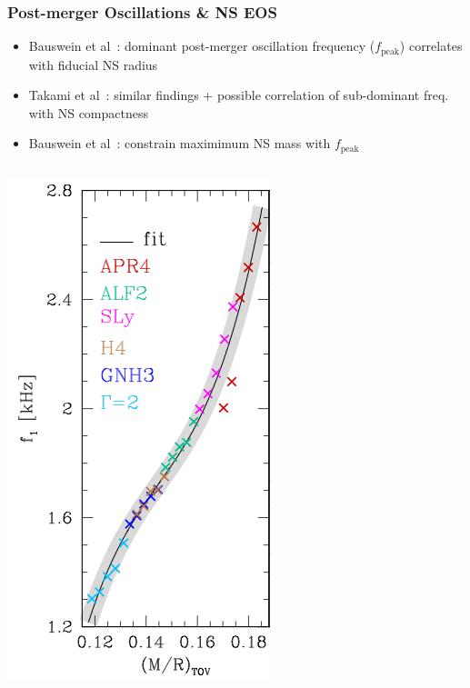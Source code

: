 \documentclass{beamer}
\begin{document}
\begin{frame}
    \frametitle{Post-merger Oscillations \& NS EOS}
    \begin{small}
    \begin{itemize}
        \item Bauswein et al~\cite{Bauswein38Eos}: dominant post-merger
            oscillation frequency ($f_{\text{peak}}$) correlates with fiducial NS radius
        \item Takami et al~\cite{2014PhRvL.113i1104T}: similar findings +
            possible correlation of sub-dominant freq. with NS compactness
        \item Bauswein et al~\cite{2013PhRvL.111m1101B}: constrain maximimum NS
            mass with $f_{\text{peak}}$
    \end{itemize}
    \begin{columns}[]
        \includegraphics[width=\textwidth]{takami_compactness.png} \\

\end{columns}
\end{small}
\end{frame}
\end{document}
